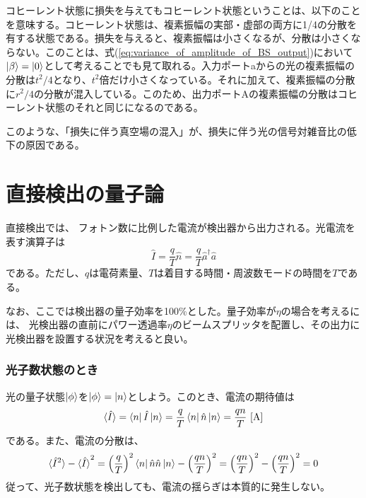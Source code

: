 コヒーレント状態に損失を与えてもコヒーレント状態ということは、以下のことを意味する。コヒーレント状態は、複素振幅の実部・虚部の両方に1/4の分散を有する状態である。損失を与えると、複素振幅は小さくなるが、分散は小さくならない。このことは、式(\ref{eq:variance_of_amplitude_of_BS_output})において$\ket \beta = \ket 0$として考えることでも見て取れる。入力ポートaからの光の複素振幅の分散は$t^2/4$となり、$t^2$倍だけ小さくなっている。それに加えて、複素振幅の分散に$r^2/4$の分散が混入している。このため、出力ポートAの複素振幅の分散はコヒーレント状態のそれと同じになるのである。

このような、「損失に伴う真空場の混入」が、損失に伴う光の信号対雑音比の低下の原因である。

\section{直接検出の量子論}

直接検出では、
フォトン数に比例した電流が検出器から出力される。光電流を表す演算子は
\begin{equation}
  \hat I = \frac{q}{T}\hat n = \frac{q}{T}\hat a^\dagger \hat a
\end{equation}
である。ただし、$q$は電荷素量、$T$は着目する時間・周波数モードの時間を$T$である。

なお、ここでは検出器の量子効率を100\%とした。量子効率が$\eta$の場合を考えるには、
光検出器の直前にパワー透過率$\eta$のビームスプリッタを配置し、その出力に光検出器を設置する状況を考えると良い。

\subsubsection{光子数状態のとき}
光の量子状態$\ket \phi$を$\ket \phi = \ket n$としよう。このとき、電流の期待値は
\begin{equation}
  \braket {\hat I} = \bra n \hat I \ket n = \frac{q}{T} \bra n \hat n \ket n = \frac{qn}{T} \ \mathrm{[A]}
\end{equation}
である。また、電流の分散は、
\begin{equation}
  \braket {\hat I^2} - \braket {\hat I}^2 = \left(\frac{q}{T}\right)^2 \bra n \hat n \hat n \ket n - \left( \frac{qn}{T} \right)^2 = \left( \frac{qn}{T} \right)^2 - \left( \frac{qn}{T} \right)^2 = 0
\end{equation}
従って、光子数状態を検出しても、電流の揺らぎは本質的に発生しない。

